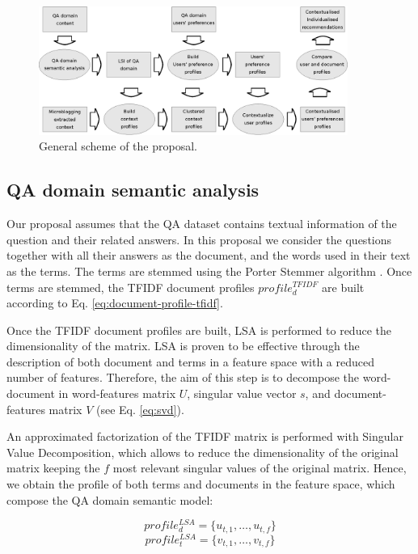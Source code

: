 \documentclass[preprint]{elsarticle}
\begin{document}
\begin{spacing}{1.5}
\begin{figure}[h]
	\centering
	\includegraphics[width=0.9\textwidth]{figures/proposal-scheme.eps}
	\caption{General scheme of the proposal.}
	\label{fig:proposal-scheme}
\end{figure}

\subsection{QA domain semantic analysis}
\label{sec:proposal-qa-semantic-analysis}

Our proposal assumes that the QA dataset contains textual information of the question and their related answers. In this proposal we consider the questions together with all their answers as the document, and the words used in their text as the terms. The terms are stemmed using the Porter Stemmer algorithm \citep{Porter1980}. Once terms are stemmed, the TFIDF document profiles $profile^{TFIDF}_{d}$ are built according to Eq. \ref{eq:document-profile-tfidf}.

Once the TFIDF document profiles are built, LSA is performed to reduce the dimensionality of the matrix. LSA is proven to be effective through the description of both document and terms in a feature space with a reduced number of features. Therefore, the aim of this step is to decompose the word-document in word-features matrix $U$, singular value vector $s$, and document-features matrix $V$ (see Eq. \ref{eq:svd}).

An approximated factorization of the TFIDF matrix is performed with Singular Value Decomposition, which allows to reduce the dimensionality of the original matrix keeping the $f$ most relevant singular values of the original matrix. Hence, we obtain the profile of both terms and documents in the feature space, which compose the QA domain semantic model:

\begin{equation}
	profile^{LSA}_d = \{ u_{t,1},\dots, u_{t,f}\}
\end{equation}
\begin{equation}
	profile^{LSA}_t = \{ v_{t,1},\dots, v_{t,f}\}
\end{equation}


\end{spacing}
\end{document}

